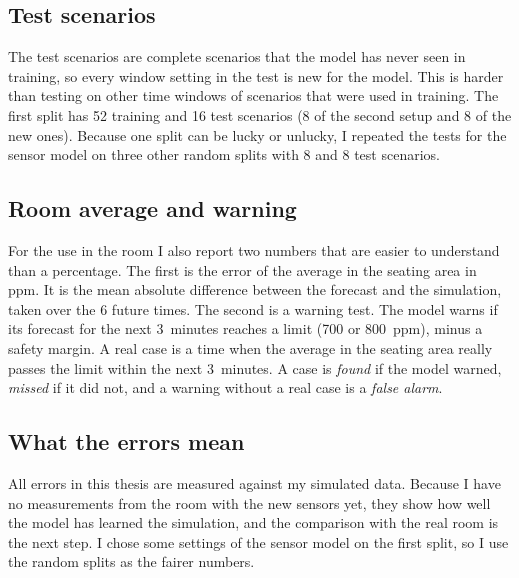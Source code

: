 \subsection*{Test scenarios}
The test scenarios are complete scenarios that the model has never seen in training, so every window setting in
the test is new for the model. This is harder than testing on other time windows of scenarios that were used in
training. The first split has 52 training and 16 test scenarios (8 of the second setup and 8 of the new ones).
Because one split can be lucky or unlucky, I repeated the tests for the sensor model on three other random
splits with 8 and 8 test scenarios.

\subsection*{Room average and warning}
For the use in the room I also report two numbers that are easier to understand than a percentage. The first is
the error of the average \cotwo{} in the seating area in ppm. It is the mean absolute difference between the
forecast and the simulation, taken over the 6 future times. The second is a warning test. The model warns if its
forecast for the next 3~minutes reaches a limit (700 or 800~ppm), minus a safety margin. A real case is a time
when the average \cotwo{} in the seating area really passes the limit within the next 3~minutes. A case is
\emph{found} if the model warned, \emph{missed} if it did not, and a warning without a real case is a
\emph{false alarm}.

\subsection*{What the errors mean}
All errors in this thesis are measured against my simulated data. Because I have no measurements from the room with
the new sensors yet, they show how well the model has learned the simulation, and the comparison with the real room
is the next step. I chose some settings of the sensor model on the first split, so I use the random splits as the
fairer numbers.
